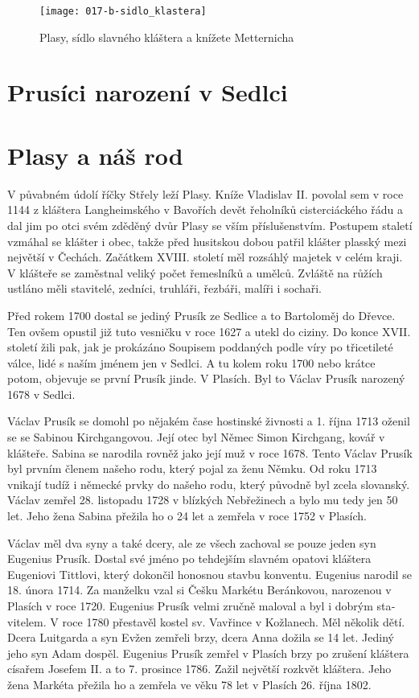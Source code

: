 \documentclass[../dejiny-rodu-prusiku.tex]{subfiles}
\begin{document}
\begin{figure}
\centering
\texttt{[image: 017-b-sidlo\_klastera]}
\caption{Plasy, sídlo slavného kláštera a knížete Metternicha}
\label{fig:017-b-sidlo_klastera}
\end{figure}

\section{Prusíci narození v Sedlci}


\section{Plasy a náš rod}
V půvabném údolí říčky Střely leží Plasy. Kníže Vladislav II. povolal sem v roce 1144 z kláštera Langheimského v Bavořích devět řeholníků cisterciácké­ho řádu a dal jim po otci svém zděděný dvůr Plasy se vším příslušenstvím. Postupem staletí vzmáhal se klášter i obec, takže před husitskou dobou patřil klášter plasský mezi největší v Čechách. Začátkem XVIII. století měl rozsáhlý majetek v celém kraji. V klášte­ře se zaměstnal veliký počet řemeslníků a umělců. Zvláště na růžích ustláno měli stavitelé, zedníci, truhláři, řezbáři, malíři i sochaři.

Před rokem 1700 dostal se jediný Prusík ze Sedlice a to Bartoloměj do Dřevce. Ten ovšem opustil již tu­to vesničku v roce 1627 a utekl do ciziny. Do konce XVII. století žili pak, jak je prokázáno Soupisem pod­daných podle víry po třicetileté válce, lidé s naším jménem jen v Sedlci. A tu kolem roku 1700 nebo krát­ce potom, objevuje se první Prusík jinde. V Plasích. Byl to Václav Prusík narozený 1678 v Sedlci.

Václav Prusík se domohl po nějakém čase hostinské živnosti a 1. října 1713 oženil se se Sabinou Kirchgangovou. Její otec byl Němec Simon Kirchgang, kovář v klášteře. Sabina se narodila rovněž jako její muž v roce 1678. Tento Václav Prusík byl prvním členem našeho rodu, který pojal za ženu Němku. Od roku 1713 vnikají tudíž i německé prvky do našeho rodu, který původně byl zcela slovanský. Václav zemřel 28. listopa­du 1728 v blízkých Nebřežinech a bylo mu tedy jen 50 let. Jeho žena Sabina přežila ho o 24 let a zemřela v roce 1752 v Plasích.

Václav měl dva syny a také dcery, ale ze všech zachoval se pouze jeden syn Eugenius Prusík. Dostal své jméno po tehdejším slavném opatovi kláštera Eugeniovi Tittlovi, který dokončil honosnou stavbu konventu. Eugenius narodil se 18. února 1714. Za manželku vzal si Češku Markétu Beránkovou, narozenou v Plasích v roce 1720. Eugenius Prusík velmi zručně maloval a byl i dobrým sta­vitelem. V roce 1780 přestavěl kostel sv. Vavřince v Kožlanech. Měl několik dětí. Dcera Luitgarda a syn Evžen zemřeli brzy, dcera Anna dožila se 14 let. Jediný jeho syn Adam dospěl. Eugenius Prusík zemřel v Plasích brzy po zrušení kláštera císařem Josefem II. a to 7. prosince 1786. Zažil největší rozkvět kláštera. Jeho žena Markéta pře­žila ho a zemřela ve věku 78 let v Plasích 26. října 1802.
\end{document}
